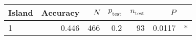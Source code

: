 
\begin{tabular}{lrrrrrl}
\toprule
Island & Accuracy & $N$ & $p_{\mbox{test}}$ & $n_{\mbox{test}}$ & $P$ & \\
\midrule
1 & 0.446 & 466 & 0.2 & 93 & 0.0117 & *\\
\bottomrule
\end{tabular}
